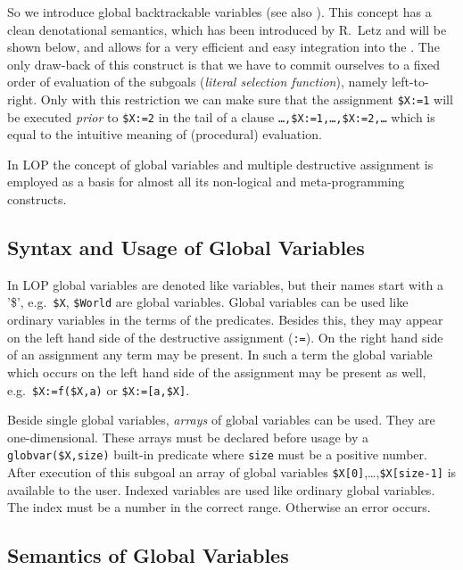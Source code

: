 So we introduce global backtrackable variables
(see also \cite{LS88}). This concept has a clean denotational
semantics, which has been introduced by R.~Letz and will be shown below,
and allows for a very efficient and easy integration into 
the \SAM.
The only draw-back of this construct is that we have to commit ourselves
to a fixed order of evaluation of the subgoals
({\em literal selection function}),
namely left-to-right. Only with this restriction we can make sure
that the assignment {\tt \$X:=1} will be executed
{\em prior\/} to {\tt \$X:=2} in the tail of
a clause {\tt \ldots,\$X:=1,\ldots,\$X:=2,\ldots} which is
equal to the intuitive meaning of (procedural) evaluation.

In LOP the concept of global variables and multiple destructive assignment
is employed as a basis for almost all its non-logical and
meta-programming constructs.


\subsection{Syntax and Usage of Global Variables}

In LOP global variables are denoted like variables, but their names
start with a '\$', e.g.\ {\tt \$X}, {\tt \$World}
are global variables.
Global variables can be used like ordinary variables in the terms
of the predicates. Besides this, they may appear on the left hand side
of the destructive assignment ({\tt :=}).
On the right hand side of an assignment any term may be present.
In such a term the global variable which occurs on the left hand side
of the assignment may be present as well,  e.g.\
{\tt \$X:=f(\$X,a)} or {\tt \$X:=[a,\$X]}.

Beside single global variables, {\em arrays\/} of global variables
can be used. They are one-dimensional.
These arrays must be declared before
usage
by a {\tt globvar(\$X,size)}
built-in predicate
where {\tt size} must be a positive number. After execution of this subgoal
an array of global variables {\tt \$X[0]},\ldots,{\tt \$X[size-1]}
is available to the user.
Indexed variables are used like ordinary global variables. The index
must be a number in the correct range.
Otherwise an error occurs.

\subsection{Semantics of Global Variables}

